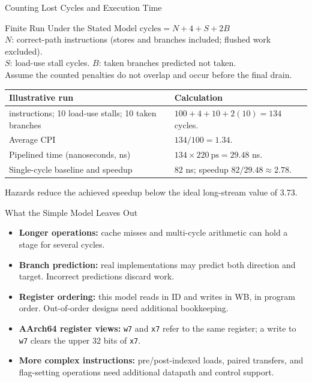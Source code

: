 \documentclass[aspectratio=169,11pt,t]{beamer}
\newcommand{\key}[1]{\textbf{#1}}
\newcommand{\code}[1]{\texttt{#1}}
\begin{document}
\begin{frame}{Counting Lost Cycles and Execution Time}

\begin{block}{Finite Run Under the Stated Model}
$\text{cycles}=N+4+S+2B$\\[.1cm]
$N$: correct-path instructions (stores and branches included; flushed work excluded).\\[.1cm]
$S$: load-use stall cycles. \quad $B$: taken branches predicted not taken.\\[.1cm]
Assume the counted penalties do not overlap and occur before the final drain.
\end{block}
\begin{center}
\small
\renewcommand{\arraystretch}{1.15}
\setlength{\tabcolsep}{5pt}
\begin{tabular}{>{\raggedright\arraybackslash}p{7.3cm}>{\raggedright\arraybackslash}p{5.6cm}}
\toprule
\rowcolor{white}
\textbf{Illustrative run} & \textbf{Calculation} \\
\midrule
100 instructions; 10 load-use stalls; 10 taken branches & $100+4+10+2(10)=134$ cycles. \\
Average CPI & $134/100=1.34$. \\
Pipelined time (nanoseconds, ns) & $134\times220\ \mathrm{ps}=29.48$ ns. \\
Single-cycle baseline and speedup & $82$ ns; speedup $82/29.48\approx2.78$. \\
\bottomrule
\end{tabular}
\end{center}

Hazards reduce the achieved speedup below the ideal long-stream value of 3.73.

\end{frame}

\begin{frame}{What the Simple Model Leaves Out}

\begin{itemize}\setlength{\itemsep}{7pt}
  \item \key{Longer operations:} cache misses and multi-cycle arithmetic can hold a stage for several cycles.
  \item \key{Branch prediction:} real implementations may predict both direction and target. Incorrect predictions discard work.
  \item \key{Register ordering:} this model reads in ID and writes in WB, in program order. Out-of-order designs need additional bookkeeping.
  \item \key{AArch64 register views:} \code{w7} and \code{x7} refer to the same register; a write to \code{w7} clears the upper 32 bits of \code{x7}.
  \item \key{More complex instructions:} pre/post-indexed loads, paired transfers, and flag-setting operations need additional datapath and control support.
\end{itemize}

\end{frame}
\end{document}
